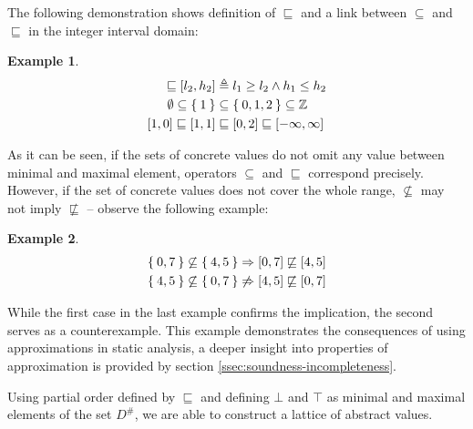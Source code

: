 \documentclass[12pt,oneside]{fithesis2}
\theoremstyle{definition}
\newtheorem{exmp}{Example}[section]
\begin{document}
The following demonstration shows definition of $\sqsubseteq$ and a link between $\subseteq$ and $\sqsubseteq$ in the integer interval domain:

\begin{exmp}
  \begin{align*}
    [l_1, h_1] \sqsubseteq [l_2, h_2] &\triangleq l_1 \ge l_2 \wedge h_1 \le h_2\\
    \emptyset \subseteq \Set{1} &\subseteq \Set{0, 1, 2} \subseteq \mathbb Z\\
    [1,0] \sqsubseteq [1,1] &\sqsubseteq [0,2] \sqsubseteq [-\infty,\infty]
  \end{align*}
\end{exmp}

As it can be seen, if the sets of concrete values do not omit any value between minimal and maximal element, operators $\subseteq$ and $\sqsubseteq$ correspond precisely. However, if the set of concrete values does not cover the whole range, $\not\subseteq$ may not imply $\not\sqsubseteq$ -- observe the following example:

\begin{exmp}
  \begin{align*}
    \Set{0, 7} \not\subseteq \Set{4, 5} &\Rightarrow [0,7] \not\sqsubseteq [4,5]\\
    \Set{ 4, 5} \not\subseteq \Set{0, 7} &\not\Rightarrow [4,5] \not\sqsubseteq [0,7]\\
  \end{align*}
\end{exmp}

While the first case in the last example confirms the implication, the second serves as a counterexample. This example demonstrates the consequences of using approximations in static analysis, a deeper insight into properties of approximation is provided by section \ref{ssec:soundness-incompleteness}.

Using partial order defined by $\sqsubseteq$ and defining $\bot$ and $\top$ as minimal and maximal elements of the set $D^\#$, we are able to construct a lattice of abstract values.
\end{document}
